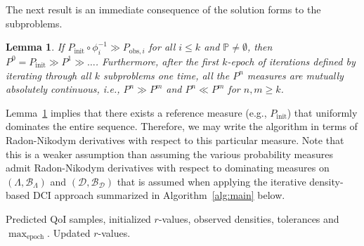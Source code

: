 \documentclass{article}
\newtheorem{lemma}{Lemma}[section]
\newcommand{\p}{\mathbb{P}}
\newcommand{\tmw}[1]{{\color{red} #1}}
\newcommand{\pspace}{\Lambda}
\newcommand{\dspace}{\mathcal{D}}
\newcommand{\pborel}{\mathcal{B}_{\pspace}}
\newcommand{\dborel}{\mathcal{B}_{\dspace}}
\newcommand{\initmeas}{P_{\text{init}}}
\begin{document}
The next result is an immediate consequence of the solution forms to the subproblems.

\begin{lemma} \label{lemma:seq_con}
If $\initmeas \circ \phi_i^{-1} \gg P_{\text{obs},i}$ for all $i\leq k$ and $\p\neq\emptyset$, then $P^{0}=\initmeas \gg P^{1} \gg \dots$. 
Furthermore, after the first $k$-epoch of iterations defined by iterating through all $k$ subproblems one time, all the $P^{n}$ measures are mutually absolutely continuous, i.e., $P^{n}\gg P^m$ and $P^n \ll P^m$ for $n, m\geq k $.
\end{lemma}

Lemma~\ref{lemma:seq_con} implies that there exists a reference measure (e.g., $\initmeas$) that uniformly dominates the entire sequence. 
Therefore, we may write the algorithm in terms of Radon-Nikodym derivatives with respect to this particular measure. 
Note that this is a weaker assumption than assuming the various probability measures admit Radon-Nikodym derivatives with respect to dominating measures on $(\pspace,\pborel)$ and $(\dspace,\dborel)$ that is assumed when applying the iterative density-based DCI approach summarized in Algorithm~\ref{alg:main} below. 

\begin{algorithm}\caption{Iterative DCI}\label{alg:main}
\begin{algorithmic}
    \REQUIRE Predicted QoI samples, initialized $r$-values, observed densities, tolerances and $\max_\text{epoch}.$  
            \ELSE
            \ENDIF
        \ENDFOR
            \ELSE
        \ENDIF
    \ENDFOR
    \ENSURE Updated $r$-values.
\end{algorithmic}
\end{algorithm}
\end{document}

